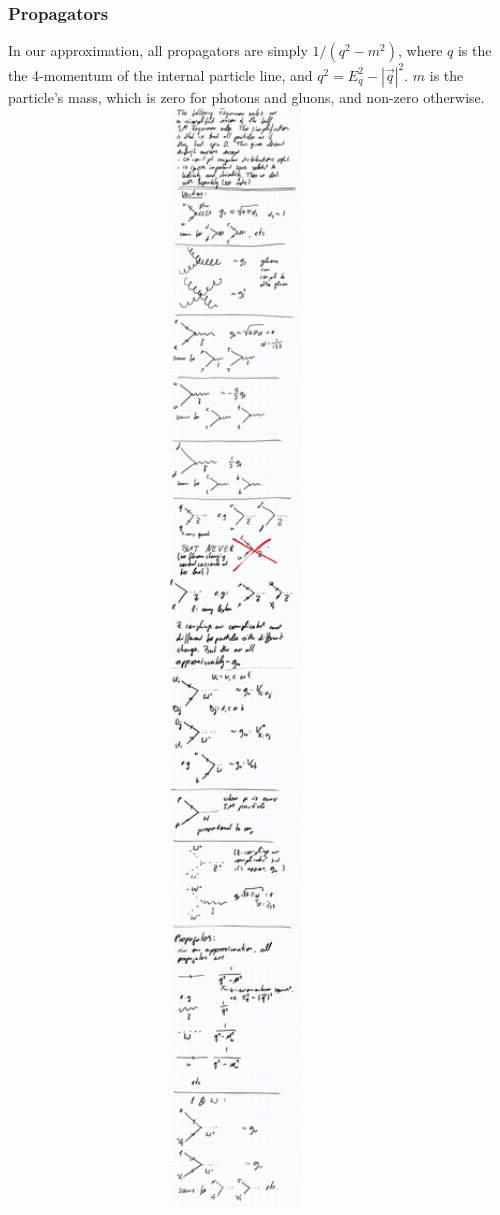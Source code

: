 \subsubsection{Propagators}
In our approximation, all propagators are simply $1/(q^2 - m^2)$, where $q$ is the the 4-momentum of the internal particle line, and $q^2 = E_q^2 - |\vec{q}|^2$. $m$ is the particle's mass, which is zero for photons and gluons, and non-zero otherwise.\\
\includegraphics[width=0.9\textwidth]{fig/summary/F_prop}


